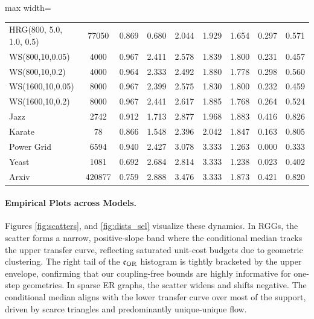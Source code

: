 \documentclass[twoside,11pt]{article}
\numberwithin{equation}{section}
\numberwithin{theorem}{section}
\numberwithin{example}{section}
\begin{document}
\begin{table}
\begin{adjustbox}{max width=\textwidth}
\begin{tabular}{l c c r r r r r r}
HRG(800, 5.0, 1.0, 0.5) & 77050 & 0.869 & 0.680 & 2.044 & 1.929 & 1.654 & 0.297 & 0.571 \\
WS(800,10,0.05) & 4000 & 0.967 & 2.411 & 2.578 & 1.839 & 1.800 & 0.231 & 0.457 \\
WS(800,10,0.2) & 4000 & 0.964 & 2.333 & 2.492 & 1.880 & 1.778 & 0.298 & 0.560 \\
WS(1600,10,0.05) & 8000 & 0.967 & 2.399 & 2.575 & 1.830 & 1.800 & 0.232 & 0.459 \\
WS(1600,10,0.2) & 8000 & 0.967 & 2.441 & 2.617 & 1.885 & 1.768 & 0.264 & 0.524 \\
Jazz & 2742 & 0.912 & 1.713 & 2.877 & 1.968 & 1.883 & 0.416 & 0.826 \\
Karate & 78 & 0.866 & 1.548 & 2.396 & 2.042 & 1.847 & 0.163 & 0.805 \\
Power Grid & 6594 & 0.940 & 2.427 & 3.078 & 3.333 & 1.263 & 0.000 & 0.333 \\
Yeast & 1081 & 0.692 & 2.684 & 2.814 & 3.333 & 1.238 & 0.023 & 0.402 \\
Arxiv & 420877 & 0.759 & 2.888 & 3.476 & 3.333 & 1.873 & 0.421 & 0.820 \\
\bottomrule
\end{tabular}
\end{adjustbox}
\end{table}


\paragraph{Empirical Plots across Models.} 


Figures \ref{fig:scatters}, and \ref{fig:dists_sel} visualize these dynamics. In RGGs, the scatter forms a narrow, positive-slope band where the conditional median tracks the upper transfer curve, reflecting saturated unit-cost budgets due to geometric clustering. The right tail of the $\mathfrak c_{\rm OR}$ histogram is tightly bracketed by the upper envelope, confirming that our coupling-free bounds are highly informative for one-step geometries. In sparse ER graphs, the scatter widens and shifts negative. The conditional median aligns with the lower transfer curve over most of the support, driven by scarce triangles and predominantly unique-unique flow. 
\end{document}
